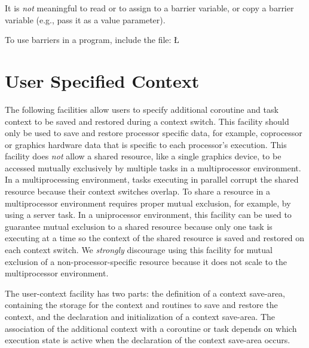 \documentclass[openright,twoside]{report}
\begin{document}
It is \emph{not} meaningful to read or to assign to a barrier variable, or copy a barrier variable (e.g., pass it as a value parameter).

To use barriers in a \uC program, include the file:
\LGinlinefalse\LGbegin\lgrinde
\L{}
\endlgrinde\LGend
{}%


\section{User Specified Context}

The following facilities allow users to specify additional coroutine and task context to be saved and restored during a context switch.
This facility should only be used to save and restore processor specific data, for example, coprocessor or graphics hardware data that is specific to each processor's execution.
This facility does \emph{not} allow a shared resource, like a single graphics device, to be accessed mutually exclusively by multiple tasks in a multiprocessor environment.
In a multiprocessing environment, tasks executing in parallel corrupt the shared resource because their context switches overlap.
To share a resource in a multiprocessor environment requires proper mutual exclusion, for example, by using a server task.
In a uniprocessor environment, this facility can be used to guarantee mutual exclusion to a shared resource because only one task is executing at a time so the context of the shared resource is saved and restored on each context switch.
We \emph{strongly} discourage using this facility for mutual exclusion of a non-processor-specific resource because it does not scale to the multiprocessor environment.

The user-context facility has two parts: the definition of a context save-area, containing the storage for the context and routines to save and restore the context, and the declaration and initialization of a context save-area.
The association of the additional context with a coroutine or task depends on which execution state is active when the declaration of the context save-area occurs.
\end{document}
